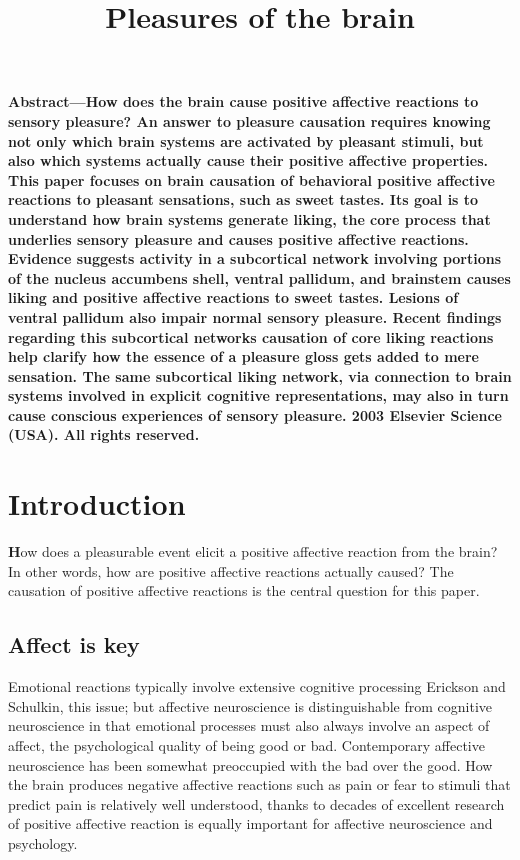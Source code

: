\documentclass[conference]{IEEEtran}
\begin{document}
\title{Pleasures of the brain}
\author{
}
\maketitle





\begin{flushleft}
\textbf{Abstract—How does the brain cause positive affective reactions to sensory pleasure? An answer to pleasure causation requires knowing not
only which brain systems are activated by pleasant stimuli, but also which systems actually cause their positive affective properties.
This paper focuses on brain causation of behavioral positive affective reactions to pleasant sensations, such as sweet tastes. Its goal is
to understand how brain systems generate liking, the core process that underlies sensory pleasure and causes positive affective
reactions. Evidence suggests activity in a subcortical network involving portions of the nucleus accumbens shell, ventral pallidum,
and brainstem causes liking and positive affective reactions to sweet tastes. Lesions of ventral pallidum also impair normal sensory
pleasure. Recent findings regarding this subcortical networks causation of core liking reactions help clarify how the essence of a
pleasure gloss gets added to mere sensation. The same subcortical liking network, via connection to brain systems involved in
explicit cognitive representations, may also in turn cause conscious experiences of sensory pleasure.
 2003 Elsevier Science (USA). All rights reserved.}
\end{flushleft}



\section{Introduction}

 \textbf{H}ow does a pleasurable event elicit a positive affective reaction from the brain? In other words, how are
positive affective reactions actually caused? The causation of positive affective reactions is the central question
for this paper.
\subsection{Affect is key}
 Emotional reactions typically involve extensive cognitive processing  Erickson and Schulkin, this issue; but affective neuroscience is distinguishable from cognitive neuroscience in that emotional
processes must also always involve an aspect of affect,
the psychological quality of being good or bad.
Contemporary affective neuroscience has been
somewhat preoccupied with the bad over the good. How
the brain produces negative affective reactions such as
pain or fear to stimuli that predict pain is relatively well
understood, thanks to decades of excellent research
of positive affective reaction is equally important for
affective neuroscience and psychology.
\end{document}
